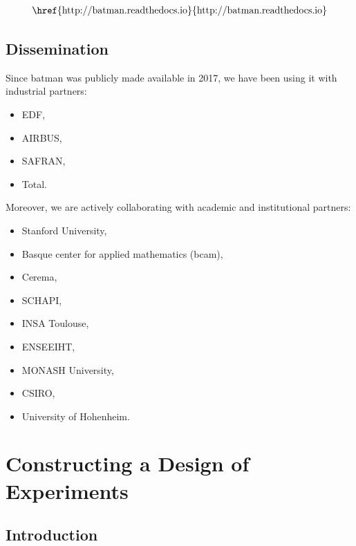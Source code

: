 \begin{align}
\text{\href{http://batman.readthedocs.io}{http://batman.readthedocs.io}}	\nonumber
\end{align}
    

\section{Dissemination}

Since batman was publicly made available in 2017, we have been using it with industrial partners:

\begin{itemize}
\item EDF,
\item AIRBUS,
\item SAFRAN,
\item Total.
\end{itemize}

Moreover, we are actively collaborating with academic and institutional partners:

\begin{itemize}
\item Stanford University,
\item Basque center for applied mathematics (bcam),
\item Cerema,
\item SCHAPI,
\item INSA Toulouse,
\item ENSEEIHT,
\item MONASH University,
\item CSIRO,
\item University of Hohenheim.
\end{itemize}

\chapter{Constructing a Design of Experiments}\label{chap:doe}

\section{Introduction}

